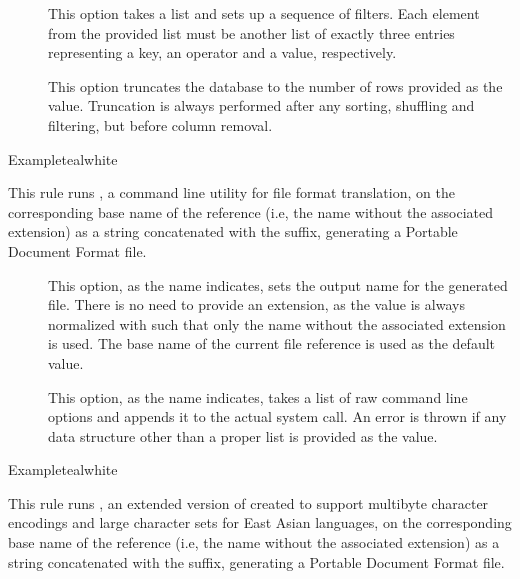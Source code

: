 \begin{description}
\begin{description}
\item[] This option takes a list and sets up a sequence of filters. Each element from the provided list must be another list of exactly three entries representing a key, an operator and a value, respectively.

\item[] This option truncates the database to the number of rows provided as the value. Truncation is always performed after any sorting, shuffling and filtering, but before column removal.
\end{description}

\begin{codebox}{Example}{teal}{\icnote}{white}
\end{codebox}

\item[\rulebox{dvipdfm}]
This rule runs , a command line utility for file format translation, on the corresponding base name of the  reference (i.e, the name without the associated extension) as a string concatenated with the  suffix, generating a Portable Document Format  file.

\begin{description}
\item[] This option, as the name indicates, sets the output name for the generated  file. There is no need to provide an extension, as the value is always normalized with  such that only the name without the associated extension is used. The base name of the current file reference is used as the default value.

\item[] This option, as the name indicates, takes a list of raw command line options and appends it to the actual system call. An error is thrown if any data structure other than a proper list is provided as the value.
\end{description}

\begin{codebox}{Example}{teal}{\icnote}{white}
\end{codebox}

\item[\rulebox{dvipdfmx}]
This rule runs , an extended version of  created to support multibyte character encodings and large character sets for East Asian languages, on the corresponding base name of the  reference (i.e, the name without the associated extension) as a string concatenated with the  suffix, generating a Portable Document Format  file.


\end{description}
